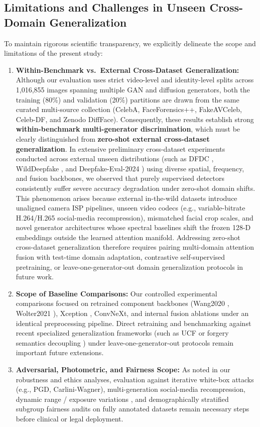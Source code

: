 \documentclass[fleqn,10pt]{wlscirep}
\begin{document}
\subsection*{Limitations and Challenges in Unseen Cross-Domain Generalization}
To maintain rigorous scientific transparency, we explicitly delineate the scope and limitations of the present study:
\begin{enumerate}
    \item \textbf{Within-Benchmark vs.\ External Cross-Dataset Generalization:} Although our evaluation uses strict video-level and identity-level splits across 1,016,855 images spanning multiple GAN and diffusion generators, both the training (80\%) and validation (20\%) partitions are drawn from the same curated multi-source collection (CelebA, FaceForensics++, FakeAVCeleb, Celeb-DF, and Zenodo DiffFace). Consequently, these results establish strong \textbf{within-benchmark multi-generator discrimination}, which must be clearly distinguished from \textbf{zero-shot external cross-dataset generalization}. In extensive preliminary cross-dataset experiments conducted across external unseen distributions (such as DFDC \cite{ref39}, WildDeepfake \cite{ref40}, and Deepfake-Eval-2024 \cite{ref15}) using diverse spatial, frequency, and fusion backbones, we observed that purely supervised detectors consistently suffer severe accuracy degradation under zero-shot domain shifts. This phenomenon arises because external in-the-wild datasets introduce unaligned camera ISP pipelines, unseen video codecs (e.g., variable-bitrate H.264/H.265 social-media recompression), mismatched facial crop scales, and novel generator architectures whose spectral baselines shift the frozen 128-D embeddings outside the learned attention manifold. Addressing zero-shot cross-dataset generalization therefore requires pairing multi-domain attention fusion with test-time domain adaptation, contrastive self-supervised pretraining, or leave-one-generator-out domain generalization protocols in future work.
    \item \textbf{Scope of Baseline Comparisons:} Our controlled experimental comparisons focused on retrained component backbones (Wang2020 \cite{ref4}, Wolter2021 \cite{ref8}), Xception \cite{ref28}, ConvNeXt, and internal fusion ablations under an identical preprocessing pipeline. Direct retraining and benchmarking against recent specialized generalization frameworks (such as UCF \cite{ref31} or forgery semantics decoupling \cite{ref29}) under leave-one-generator-out protocols remain important future extensions.
    \item \textbf{Adversarial, Photometric, and Fairness Scope:} As noted in our robustness and ethics analyses, evaluation against iterative white-box attacks (e.g., PGD, Carlini-Wagner), multi-generation social-media recompression, dynamic range / exposure variations \cite{ref38}, and demographically stratified subgroup fairness audits on fully annotated datasets remain necessary steps before clinical or legal deployment.
\end{enumerate}
\end{document}
